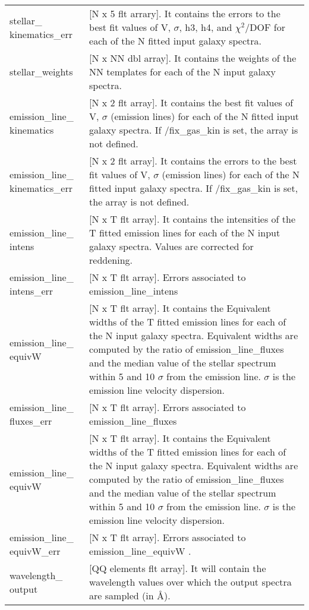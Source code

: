 \begin{center}
\begin{longtable}{p{2.7cm}| p{11.1cm}}
  stellar\_ kinematics\_err &[N x 5 flt arrary].  It contains the errors to the best fit values of V, $\sigma$, h3, h4, and $\chi^2$/DOF for each of the N fitted input galaxy spectra.\\
  stellar\_weights        &[N x NN dbl array]. It contains the weights of the NN templates for each of the N input galaxy spectra.\\
  emission\_line\_ kinematics &[N x 2 flt array].  It contains the best fit values of V, $\sigma$ (emission lines) for each of the N fitted
                            input galaxy spectra. If /fix\_gas\_kin is set, the array is not defined.\\
 emission\_line\_ kinematics\_err & [N x 2 flt array].  It contains the errors to the best fit values of V, $\sigma$ (emission lines) for each of the N fitted input galaxy spectra. If /fix\_gas\_kin is set, the array is not defined.\\
 emission\_line\_ intens  &[N x T flt array].  It contains the intensities of the T fitted emission lines for each of the N input galaxy spectra. Values are corrected for reddening.\\
%
 emission\_line\_ intens\_err &  [N x T flt array].  Errors associated to emission\_line\_intens \\
%
 emission\_line\_ equivW      & [N x T flt array]. It contains the Equivalent widths of the T fitted emission lines for each of the N input galaxy spectra.                            Equivalent widths are computed by the ratio of emission\_line\_fluxes and the median value of the stellar spectrum within 5 and 10 $\sigma$ from the emission line. $\sigma$ is the emission line velocity dispersion. \\
%
 emission\_line\_ fluxes\_err &  [N x T flt array].  Errors associated to emission\_line\_fluxes \\
%
 emission\_line\_ equivW      & [N x T flt array]. It contains the Equivalent widths of the T fitted emission lines for each of the N input galaxy spectra.                            Equivalent widths are computed by the ratio of emission\_line\_fluxes and the median value of the stellar spectrum within 5 and 10 $\sigma$ from the emission line. $\sigma$ is the emission line velocity dispersion. \\
%
 emission\_line\_ equivW\_err  & [N x T flt array]. Errors associated to emission\_line\_equivW  . \\
%
 wavelength\_ output     & [QQ elements flt array]. It will contain the wavelength values over which the output spectra are sampled (in \AA). 

\end{longtable}
\end{center}
